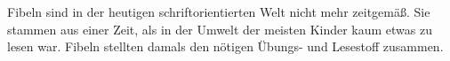 Fibeln sind in der heutigen schriftorientierten Welt nicht mehr zeitgemäß.
Sie stammen aus einer Zeit, als in der Umwelt der meisten Kinder kaum etwas zu lesen war.
Fibeln stellten damals den nötigen Übungs- und Lesestoff zusammen.